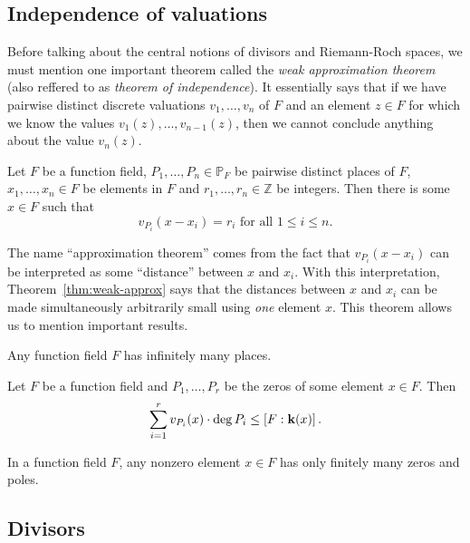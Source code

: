 \subsection{Independence of valuations}

Before talking about the central notions of divisors and Riemann-Roch spaces, we
must mention one important theorem called the \emph{weak approximation theorem}
(also reffered to as \emph{theorem of independence}). It essentially says that
if we have pairwise distinct discrete valuations $v_1, \dots, v_n$ of $F$ and an
element $z\in F$ for which we know the values $v_1(z), \dots, v_{n-1}(z)$, then
we cannot conclude anything about the value $v_n(z)$.
\begin{thm}
  \label{thm:weak-approx}
  Let $F$ be a function field, $P_1, \dots, P_n\in\mathbb{P}_F$ be pairwise
  distinct places of $F$, $x_1, \dots, x_n\in F$ be elements in $F$ and $r_1,
  \dots, r_n\in\mathbb{Z}$ be integers. Then there is some $x\in F$ such that
  \[
    v_{P_i}(x-x_i) = r_i\text{ for all }1\leq i\leq n.
  \]
\end{thm}
The name ``approximation theorem'' comes from the fact that $v_{P_i}(x-x_i)$ can
be interpreted as some ``distance'' between $x$ and $x_i$. With this
interpretation, Theorem~\ref{thm:weak-approx} says that the distances between
$x$ and $x_i$ can be made simultaneously arbitrarily small using \emph{one}
element $x$. This theorem allows us to mention important results.
\begin{cor}
  Any function field $F$ has infinitely many places.
\end{cor}
\begin{prop}
  Let $F$ be a function field and $P_1, \dots, P_r$ be the zeros of some element
  $x\in F$. Then
  \[
    \sum_{i=1}^r{v_{P_i}(x)\cdot\deg P_i}\leq \left[ F:\mathbf{k}(x) \right].
  \]
\end{prop}
\begin{cor}
  In a function field $F$, any nonzero element $x\in F$ has only finitely many
  zeros and poles.
\end{cor}

\subsection{Divisors}

